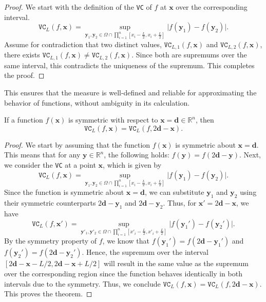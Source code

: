 \documentclass[final]{siamart220329}
\newtheorem{theoretical insights}{Theoretical insights}
\newtheorem{practical takeaway}{Practical takeaway}
\begin{document}
{\begin{theorem}
\end{theorem}


\begin{proof}
We start with the definition of the \texttt{VC} of \(f\) at \({\bm x}\) over the corresponding interval.  
\[
\texttt{VC}_{L}(f, {\bm x}) = \sup_{{\bm y}_1, {\bm y}_2 \in \Omega \cap 
 \prod_{i=1}^{n} [{x}_i-\frac{L}{2}, {x}_i+\frac{L}{2}]} \vert f({\bm y}_1) - f({\bm y}_2) \vert.
\]
Assume for contradiction that two distinct values, \(\texttt{VC}_{L,1}(f, {\bm x})\) and \(\texttt{VC}_{L,2}(f, {\bm x})\), there exists 
\( 
\texttt{VC}_{L,1}(f, {\bm x}) \neq \texttt{VC}_{L,2}(f, {\bm x}).
\) 
Since both are supremums over the same interval, this contradicts the uniqueness of the supremum. 
This completes the proof.
\end{proof}


This ensures that the measure is well-defined and reliable for approximating the behavior of functions, without ambiguity in its calculation.


\begin{theorem} 
If a function \(f(\bm x)\) is symmetric with respect to \({\bm x}={\bm d}\in\mathbb{R}^n\), then 
\begin{equation}
\texttt{VC}_{L}(f, {\bm x})=\texttt{VC}_{L}(f, 2{\bm d} -{\bm x}).
\end{equation}
\end{theorem}

\begin{proof}
We start by assuming that the function \(f(\bm{x})\) is symmetric about \({\bm x} = {\bm d}\). This means that for any \({\bm y} \in \mathbb{R}^n\), the following holds:
\(
f({\bm y}) = f(2{\bm d}  - {\bm y}).
\) 
Next, we consider the \texttt{VC} at a point \({\bm x}\), which is given by 
\[
\texttt{VC}_{L}(f, {\bm x}) = \sup_{{\bm y}_1, {\bm y}_2 \in \Omega \cap \prod_{i=1}^{n} [{x}_i-\frac{L}{2}, {x}_i+\frac{L}{2}]} \vert f({\bm y}_1) - f({\bm y}_2) \vert.
\]
Since the function is symmetric about \({\bm x} = {\bm d}\), we can substitute \({\bm y}_1\) and \({\bm y}_2\) using their symmetric counterparts \(2{\bm d}  - {\bm y}_1\) and \(2{\bm d}  - {\bm y}_2\). Thus, for \({\bm x}' = 2{\bm d}  - {\bm x}\), we have 
\[
\texttt{VC}_{L}(f, {\bm x}') = \sup_{{\bm y}'_1, {\bm y}'_2 \in \Omega \cap  \prod_{i=1}^{n} [{x}'_i-\frac{L}{2}, {x}'_i+\frac{L}{2}]} \vert f({\bm y}_1') - f({\bm y}_2') \vert.
\]
By the symmetry property of \(f\), we know that 
\(
f({\bm y}_1') = f(2{\bm d}  - {\bm y}_1')\)  and \(f({\bm y}_2') = f(2{\bm d}  - {\bm y}_2')\). 
Hence, the supremum over the interval \([2{\bm d}  - {\bm x} - L/2, 2{\bm d}  - {\bm x} + L/2]\) will result in the same value as the supremum over the corresponding region since the function behaves identically in both intervals due to the symmetry. Thus, we conclude
\(
\texttt{VC}_{L}(f, {\bm x}) = \texttt{VC}_{L}(f, 2{\bm d}  - {\bm x}).
\) 
This proves the theorem.
\end{proof}

}
\end{document}

